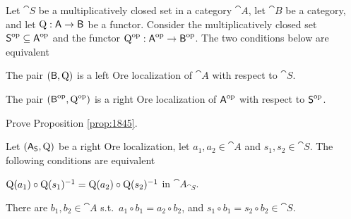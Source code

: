 \begin{prop} \label{prop:1845}
Let $\cat{S}$ be a multiplicatively closed set in a category $\cat{A}$, 
let $\cat{B}$ be a category, 
and let $\operatorname{Q} : \operatorname{\mathsf{A}} \to \operatorname{\mathsf{B}}$ be a functor. 
Consider the multiplicatively closed set 
$\operatorname{\mathsf{S}}^{\mathrm{op}} \subseteq \operatorname{\mathsf{A}}^{\mathrm{op}}$ and the functor 
$\operatorname{Q}^{\mathrm{op}} : \operatorname{\mathsf{A}}^{\mathrm{op}} \to \operatorname{\mathsf{B}}^{\mathrm{op}}$. 
The two conditions below are equivalent\tup{:}
\begin{itemize}
 The pair $(\operatorname{\mathsf{B}}, \operatorname{Q})$ is a left Ore localization of 
$\cat{A}$ with respect to $\cat{S}$. 

 The pair $(\operatorname{\mathsf{B}}^{\mathrm{op}}, \operatorname{Q}^{\mathrm{op}})$ is a right Ore 
localization of $\operatorname{\mathsf{A}}^{\mathrm{op}}$ with respect to $\operatorname{\mathsf{S}}^{\mathrm{op}}$. 
\end{itemize}
\end{prop}

\begin{exer} \label{exer:1845}
Prove Proposition \ref{prop:1845}. 
\end{exer}

\begin{lem} \label{lem:3}
Let $(\operatorname{\mathsf{A}}_{\operatorname{\mathsf{S}}}, \operatorname{Q})$ be a right Ore localization, 
let $a_1, a_2 \in \cat{A}$ and $s_1, s_2 \in \cat{S}$.
The following conditions are equivalent\tup{:}
\begin{enumerate}
$\operatorname{Q}(a_1) \circ \operatorname{Q}(s_1)^{-1} =  
\operatorname{Q}(a_2) \circ \operatorname{Q}(s_2)^{-1}$
in $\cat{A}_{\cat{S}}$. 

 There are $b_1, b_2 \in \cat{A}$ s.t.\ 
$a_1 \circ b_1 = a_2 \circ b_2$,
and $s_1 \circ b_1  = s_2 \circ b_2 \in \cat{S}$.
\end{enumerate}
\end{lem}

